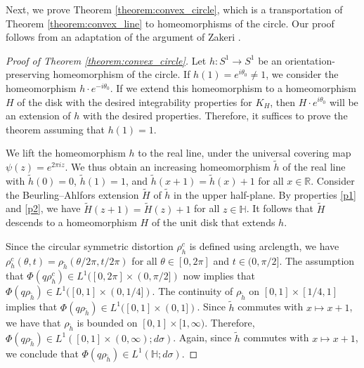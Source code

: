 \documentclass{amsart}
\theoremstyle{plain}
\theoremstyle{definition}
\theoremstyle{remark}
\numberwithin{equation}{section}
\numberwithin{theorem}{section}
\numberwithin{conjecture}{section}
\newcommand{\R}{\mathbb R}
\newcommand{\1}{\mathbf 1}
\newcommand{\UHP}{\mathbb H}
\begin{document}
Next, we prove Theorem \ref{theorem:convex_circle}, which is a transportation of Theorem \ref{theorem:convex_line} to homeomorphisms of the circle. Our proof follows from an adaptation of the argument of Zakeri \cite[p.~243]{Zakeri:boundary}.

\begin{proof}[Proof of Theorem \ref{theorem:convex_circle}]
Let $h\colon S^1\to S^1$ be an orientation-preserving homeomorphism of the circle. If $h(1)= e^{i\theta_0}\neq 1$, we consider the homeomorphism $h\cdot e^{-i\theta_0}$. If we extend this homeomorphism to a homeomorphism $H$ of the disk with the desired integrability properties for $K_H$, then $H\cdot e^{i\theta_0}$ will be an extension of $h$ with the desired properties. Therefore, it suffices to prove the theorem assuming that $h(1)=1$.

We lift the homeomorphism $h$ to the real line, under the universal covering map $\psi(z)=e^{2\pi i z}$. We thus obtain an increasing homeomorphism $\widetilde h$ of the real line with $\widetilde h(0)=0$, $\widetilde h(1)=1$, and $\widetilde h(x+1)=\widetilde h(x)+1$ for all $x\in \R$. Consider the Beurling--Ahlfors extension $\widetilde H$ of $\widetilde h$ in the upper half-plane. By properties \ref{p1} and \ref{p2}, we have $\widetilde H(z+1)=\widetilde H(z)+1$ for all $z\in \UHP$. It follows that $\widetilde H$ descends to a homeomorphism $H$ of the unit disk that extends $h$.

Since the circular symmetric distortion $\rho_h^c$ is defined using arclength, we have $\rho_h^c(\theta,t) =\rho_{\widetilde h}(\theta/2\pi, t/2\pi)$ for all $\theta\in [0,2\pi]$ and $t\in (0,\pi/2]$. The assumption that $\Phi(q \rho_h^c)\in L^1([0,2\pi]\times(0,\pi/2])$ now implies that $\Phi(q\rho_{\widetilde h}) \in L^1([0,1]\times (0,1/4])$. The continuity of $\rho_{\widetilde h}$ on $[0,1]\times [1/4,1]$ implies that $\Phi(q\rho_{\widetilde h}) \in L^1([0,1]\times (0,1])$. Since $\widetilde h$ commutes with $x\mapsto x+1$, we have that $\rho_{\widetilde h}$ is bounded on $[0,1]\times [1,\infty)$. Therefore, $\Phi(q\rho_{\widetilde h})  \in L^1 ([0,1]\times (0,\infty); d\sigma)$. Again, since $\widetilde h$ commutes with $x\mapsto x+1$, we conclude that $\Phi(q\rho_{\widetilde h})  \in L^1( \UHP; d\sigma)$. 


\end{proof}
\end{document}
